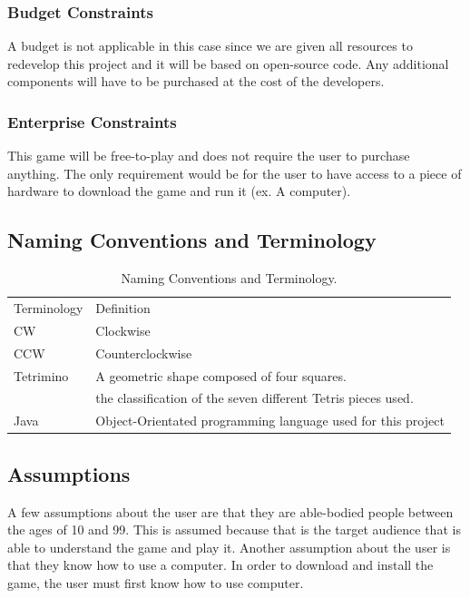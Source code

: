 \documentclass[12pt, titlepage]{article}
\begin{document}
\subsubsection{Budget Constraints}
A budget is not applicable in this case since we are given all resources to redevelop this project and it will be based on open-source code. Any additional components will have to be purchased at the cost of the developers.
\subsubsection{Enterprise Constraints}
This game will be free-to-play and does not require the user to purchase anything. The only requirement would be for the user to have access to a piece of hardware to download the game and run it (ex. A computer).



\subsection{Naming Conventions and Terminology}

\begin{table}[!h]
	\centering
	\begin{tabular}{l|l}
	Terminology & Definition\\
	CW & Clockwise \\
	CCW & Counterclockwise\\
	Tetrimino & A geometric shape composed of four squares. \\ & the classification of the seven different Tetris pieces used.\\
	Java & Object-Orientated programming language used for this project\\
	\end{tabular}
	\caption{Naming Conventions and Terminology.}
	\label{table:term}
\end{table}


\subsection{Assumptions}
A few assumptions about the user are that they are able-bodied people between the ages of 10 and 99. This is assumed because that is the target audience that is able to understand the game and play it. Another assumption about the user is that they know how to use a computer. In order to download and install the game, the user must first know how to use computer.
\end{document}
